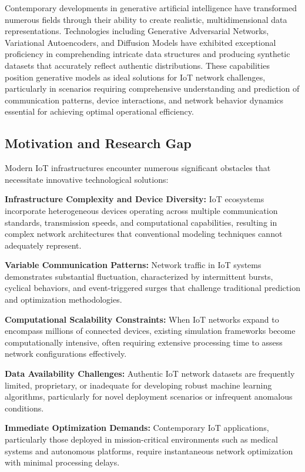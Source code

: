\documentclass[conference]{IEEEtran}
\begin{document}
Contemporary developments in generative artificial intelligence have transformed numerous fields through their ability to create realistic, multidimensional data representations. Technologies including Generative Adversarial Networks, Variational Autoencoders, and Diffusion Models have exhibited exceptional proficiency in comprehending intricate data structures and producing synthetic datasets that accurately reflect authentic distributions. These capabilities position generative models as ideal solutions for IoT network challenges, particularly in scenarios requiring comprehensive understanding and prediction of communication patterns, device interactions, and network behavior dynamics essential for achieving optimal operational efficiency.

\subsection{Motivation and Research Gap}

Modern IoT infrastructures encounter numerous significant obstacles that necessitate innovative technological solutions:

\textbf{Infrastructure Complexity and Device Diversity:} IoT ecosystems incorporate heterogeneous devices operating across multiple communication standards, transmission speeds, and computational capabilities, resulting in complex network architectures that conventional modeling techniques cannot adequately represent.

\textbf{Variable Communication Patterns:} Network traffic in IoT systems demonstrates substantial fluctuation, characterized by intermittent bursts, cyclical behaviors, and event-triggered surges that challenge traditional prediction and optimization methodologies.

\textbf{Computational Scalability Constraints:} When IoT networks expand to encompass millions of connected devices, existing simulation frameworks become computationally intensive, often requiring extensive processing time to assess network configurations effectively.

\textbf{Data Availability Challenges:} Authentic IoT network datasets are frequently limited, proprietary, or inadequate for developing robust machine learning algorithms, particularly for novel deployment scenarios or infrequent anomalous conditions.

\textbf{Immediate Optimization Demands:} Contemporary IoT applications, particularly those deployed in mission-critical environments such as medical systems and autonomous platforms, require instantaneous network optimization with minimal processing delays.
\end{document}
